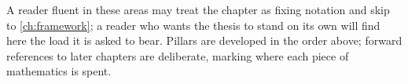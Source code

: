 A reader fluent in these areas may treat the chapter as fixing notation and skip
to \cref{ch:framework}; a reader who wants the thesis to stand on its own will
find here the load it is asked to bear. Pillars are developed in the order above;
forward references to later chapters are deliberate, marking where each piece of
mathematics is spent.


